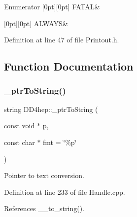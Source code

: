 \begin{DoxyEnumFields}{Enumerator}
[0pt][0pt]{}\hypertarget{namespace_d_d4hep_a5b5a64d56252469451f2020a27d57d42a7bfb778cde0373aa4be752e638d8383b}{}\label{namespace_d_d4hep_a5b5a64d56252469451f2020a27d57d42a7bfb778cde0373aa4be752e638d8383b} 
F\+A\+T\+AL&\\
\hline

[0pt][0pt]{}\hypertarget{namespace_d_d4hep_a5b5a64d56252469451f2020a27d57d42a918099d24909b9384ac28d377dbf58f1}{}\label{namespace_d_d4hep_a5b5a64d56252469451f2020a27d57d42a918099d24909b9384ac28d377dbf58f1} 
A\+L\+W\+A\+YS&\\
\hline

\end{DoxyEnumFields}


Definition at line 47 of file Printout.\+h.



\subsection{Function Documentation}
\hypertarget{namespace_d_d4hep_a33a5015e65029bf1f0908946fa049550}{}\label{namespace_d_d4hep_a33a5015e65029bf1f0908946fa049550} 
\subsubsection{\texorpdfstring{\+\_\+ptr\+To\+String()}{\_ptrToString()}}
{\footnotesize\ttfamily string D\+D4hep\+::\+\_\+ptr\+To\+String (\begin{DoxyParamCaption}\item[{const void $\ast$}]{p,  }\item[{const char $\ast$}]{fmt = {\ttfamily \char`\"{}\%p\char`\"{}} }\end{DoxyParamCaption})}



Pointer to text conversion. 



Definition at line 233 of file Handle.\+cpp.



References \+\_\+\+\_\+to\+\_\+string().



